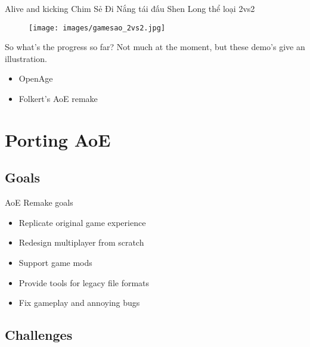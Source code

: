 \documentclass{beamer}
\begin{document}

\begin{frame}{Alive and kicking}
	Chim Sẻ Đi Nắng tái đấu Shen Long thể loại 2vs2

	\begin{figure}
	\texttt{[image: images/gamesao\_2vs2.jpg]}
	\end{figure}

\end{frame}


\begin{frame}{So what's the progress so far?}
	Not much at the moment, but these demo's give an illustration.

	\begin{itemize}
		\item OpenAge
		\item Folkert's AoE remake
	\end{itemize}
\end{frame}


\section{Porting AoE}

\subsection{Goals}

\begin{frame}{AoE Remake goals}

	\begin{itemize}
		\item Replicate original game experience
		\item Redesign multiplayer from scratch
		\item Support game mods
		\item Provide tools for legacy file formats
		\item Fix gameplay and annoying bugs
	\end{itemize}

\end{frame}


\subsection{Challenges}
\end{document}
